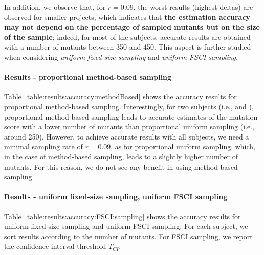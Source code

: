 

In addition, we observe that, for $r=0.09$, the worst results (highest deltas) are observed for smaller projects, which indicates that \textbf{the estimation accuracy may not depend on the percentage of sampled mutants but on the size of the sample}; indeed, for most of the subjects, accurate results  are obtained with a number of mutants between 350 and 450. This aspect is further studied when considering  \emph{uniform fixed-size sampling} and \emph{uniform FSCI sampling}.

\paragraph{Results - proportional method-based sampling}

Table~\ref{table:results:accuracy:methodBased} shows the accuracy results for proportional method-based sampling. 
Interestingly, for two subjects (i.e., \GCSP{} and \UTIL{}), proportional method-based sampling leads to accurate estimates of the mutation score with a lower number of mutants than proportional uniform sampling (i.e., around 250).
However, to achieve accurate results with all subjects, we need a minimal sampling rate of $r=0.09$, as for proportional uniform sampling, which, in the case of method-based sampling, leads to a slightly higher number of mutants. For this reason, we do not see any benefit in using method-based sampling.




\paragraph{Results - uniform fixed-size sampling, uniform FSCI sampling}



Table~\ref{table:results:accuracy:FSCI:sampling} shows the accuracy results for uniform fixed-size sampling and uniform FSCI sampling. For each subject, we sort results according to the number of mutants. For FSCI sampling, we report the confidence interval threshold $T_\mathit{CI}$. 

